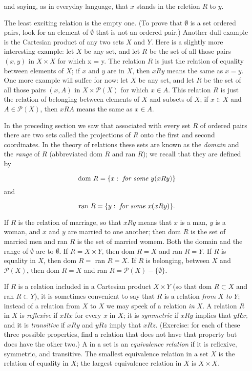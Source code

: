 and saying, as in everyday language, that $x$ stands in the reletion $R $ to $y$. 

The least exciting relation is the empty one. (To prove that $ \emptyset $ is a set ordered pairs, look for an element of $ \emptyset $ that is not an ordered pair.) Another dull example is the Cartesian product of any two sets $X$ and $Y$. Here is a slightly more interesting example: let $X$ be any set, and let $R $ be the set of all those pairs $(x, y)$ in $X \times X$ for which x = y. The relation $R $ is just the relation of equality between elements of $X$; if $x$ and $y$ are in $X$, then $x R y$ means the same as $x = y$. One more example will suffce for now: let $X$ be any set, and let $R $ be the set of all those pairs $(x, A)$ in $X \times \mathcal{P} (X)$ for which $x \in A$. This relation $R $ is just the relation of belonging between elements of $X$ and subsets of $X$; if $x \in X$ and $A \in \mathcal{P}(X)$, then $x R A$ means the same as $x \in A$. 

In the preceding section we saw that associated with every set $R$ of ordered pairs there are two sets called the projections of $R$ onto the first and second coordinates. In the theory of relations these sets are known as the \textit{domain} and the \textit{range} of $R$  (abbreviated dom $R$ and ran $R$); we recall that they are defined by 

\begin{equation*}
\text{dom } R = \{ x: \text{ \textit{for some} } y (x R y) \}
\end{equation*}
and

\begin{equation*}
\text{ran } R = \{ y: \text{ \textit{for some} } x (x R y) \}.
\end{equation*}

If $R$ is the relation of marriage, so that $x R y$ means that $x$ is a man, $y$ is a woman, and $x$ and $y$ are married to one another; then dom $R$ is the set of married men and ran $R$ is the set of married womem. Both the domain and the range of $\emptyset$ are to $\emptyset$. If $R = X \times Y$, then dom $ R = X$ and ran $R = Y$. If $R$ is equality in $X$, then dom $R =$ ran $R = X$. If $R$ is belonging, between $X$ and $\mathcal{P}(X)$, then dom $R = X$ and ran $R = \mathcal{P}(X) - \{ \emptyset \}$. 

If $R$ is a relation included in a Cartesian product $X \times Y$ (so that dom $R \subset X$ and ran $R \subset Y$), it is sometimes convenient to say that $R$ is a relation \textit{from} $X$ \textit{to} $Y$; instead of a relation from $X$ to $X$ we may speek of a relation \textit{in} $X$. A relation $R$ in $X$ is \textit{reflexive} if $x R x$ for every $x$ in $X$; it is \textit{symmetric} if $ x R y$ implies that $y R x$; and it is \textit{transitive} if $x R y$ and $y R z$ imply that $x R z$. (Exercise: for each of these three possible properties, find a relation that does not have that property but does have the other two.) A in a set is an \textit{equivalence relation} if it is reflexive, symmetric, and transitive. The smallest equivalence relation in a set $X$ is the relation of equality in $X$; the largest equivalence relation in $X$ is $X \times X$. 

